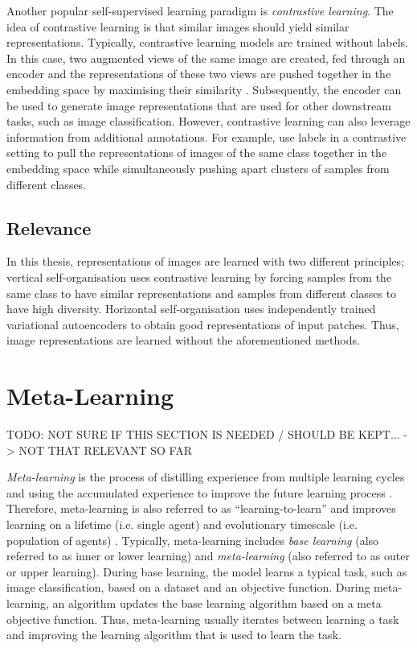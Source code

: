 Another popular self-supervised learning paradigm is \emph{contrastive learning}.
The idea of contrastive learning is that similar images should yield similar representations.
Typically, contrastive learning models are trained without labels.
In this case, two augmented views of the same image are created, fed through an encoder and the representations of these two views are pushed together in the embedding space by maximising their similarity .
Subsequently, the encoder can be used to generate image representations that are used for other downstream tasks, such as image classification.
However, contrastive learning can also leverage information from additional annotations.
For example,  use labels in a contrastive setting to pull the representations of images of the same class together in the embedding space while simultaneously pushing apart clusters of samples from different classes.

\subsection{Relevance}
In this thesis, representations of images are learned with two different principles;
vertical self-organisation uses contrastive learning by forcing samples from the same class to have similar representations and samples from different classes to have high diversity.
Horizontal self-organisation uses independently trained variational autoencoders to obtain good representations of input patches.
Thus, image representations are learned without the aforementioned methods.


\section{Meta-Learning}
TODO: NOT SURE IF THIS SECTION IS NEEDED / SHOULD BE KEPT... -> NOT THAT RELEVANT SO FAR

\emph{Meta-learning} is the process of distilling experience from multiple learning cycles and using the accumulated experience to improve the future learning process .
Therefore, meta-learning is also referred to as ``learning-to-learn''  and improves learning on a lifetime (i.e. single agent) and evolutionary timescale (i.e. population of agents) .
Typically, meta-learning includes \emph{base learning} (also referred to as inner or lower learning) and \emph{meta-learning} (also referred to as outer or upper learning).
During base learning, the model learns a typical task, such as image classification, based on a dataset and an objective function.
During meta-learning, an algorithm updates the base learning algorithm based on a meta objective function.
Thus, meta-learning usually iterates between learning a task and improving the learning algorithm that is used to learn the task.

